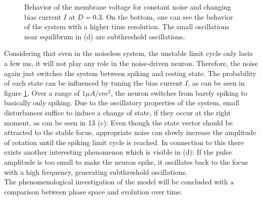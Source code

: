 \documentclass[12pt,a4paper]{article}
\begin{document}
\begin{figure}[H]
	\caption{Behavior of the membrane voltage for constant noise and changing bias current $I$ at $D=0.3$. On the bottom, one can see the behavior of the system with a higher time resolution. The small oscillations near equilibrum in (d) are subthreshold oscillations.}
	\label{ahnoise} 
\end{figure}
Considering that even in the noiseless system, the unstable limit cycle only lasts a few ms, it will not play any role in the noise-driven neuron. Therefore, the noise again just switches the system between spiking and resting state. The probability of each state can be influenced by tuning the bias current $I$, as can be seen in figure \ref{ahnoise}.
Over a range of $1\mu A/cm^2$, the neuron switches from barely spiking to basically only spiking. Due to the oscillatory properties of the system, small disturbances suffice to induce a change of state, if they occur at the right moment, as can be seen in 13 (c): Even though the state vector should be attracted to the stable focus, appropriate noise can slowly increase the amplitude of rotation until the spiking limit cycle is reached. In connection to this there exists another interesting phenomenon which is visible in (d): If the pulse amplitude is too small to make the neuron spike, it oscillates back to the focus with a high frequency, generating subthreshold oscillations.\\
The phenomenological investigation of the model will be concluded with a comparison between phase space and evolution over time.
\end{document}
